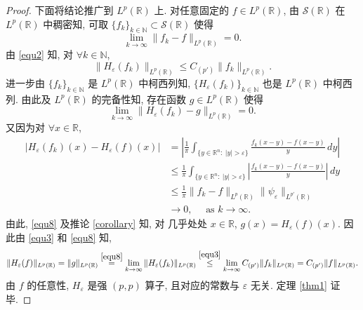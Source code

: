 \documentclass[a4paper,11pt]{article}
\theoremstyle{definition}
\begin{document}
\begin{CJK*}{UTF8}{gbsn}
\begin{proof}
    下面将结论推广到 $ L^p(\mathbb{R}) $ 上.
    对任意固定的 $ f \in L^p(\mathbb{R}) $, 
    由 $ \mathcal{S}(\mathbb{R}) $ 在 $ L^p(\mathbb{R}) $ 中稠密知, 
    可取 $ \{f_k\}_{k \in \mathbb{N}} \subset \mathcal{S}(\mathbb{R}) $ 使得
    $$
        \lim_{k \to \infty} \| f_k - f \|_{L^p(\mathbb{R})} = 0.
    $$
    由 \eqref{equ2} 知, 对 $ \forall k \in \mathbb{N} $,
    \begin{equation} \label{equ3}
        \| H_\varepsilon (f_k) \|_{L^p(\mathbb{R})} \leq C_{(p')} \| f_k \|_{L^p(\mathbb{R})}.
    \end{equation}
    进一步由 $ \{f_k\}_{k \in \mathbb{N}} $ 是 $ L^p(\mathbb{R}) $ 中柯西列知, 
    $ \{H_\varepsilon (f_k)\}_{k \in \mathbb{N}} $ 也是 $ L^p(\mathbb{R}) $ 中柯西列.
    由此及 $ L^p(\mathbb{R}) $ 的完备性知, 存在函数 $ g \in L^p(\mathbb{R}) $ 使得
    \begin{equation} \label{equ8}
        \lim_{k \to \infty} \| H_\varepsilon (f_k) - g \|_{L^p(\mathbb{R})} = 0.
    \end{equation}
    又因为对 $ \forall x \in \mathbb{R} $,
    \begin{align*}
        \left|H_\varepsilon (f_k) (x) - H_\varepsilon (f) (x)\right|
            &= \left| \frac{1}{\pi} \int_{\{y \in \mathbb{R}^n :\ |y| > \varepsilon\}} \frac{f_k(x - y) - f(x - y)}{y} \, dy \right| \\
            &\leq \frac{1}{\pi} \int_{\{y \in \mathbb{R}^n :\ |y| > \varepsilon\}} \left| \frac{f_k(x - y) - f(x - y)}{y} \right| \, dy \\
            &\leq \frac{1}{\pi} \| f_k - f \|_{L^p(\mathbb{R})} 
                \| \psi_\varepsilon \|_{L^{p'}(\mathbb{R})} \\
            &\to  0,  \quad \text{ as } k \to \infty.
    \end{align*}
    由此, \eqref{equ8} 及推论 \ref{corollary} 知, 对 几乎处处 $ x \in \mathbb{R} $, $ g(x) = H_\varepsilon (f) (x) $.
    因此由 \eqref{equ3} 和 \eqref{equ8} 知, 
    $$
        \| H_\varepsilon (f) \|_{L^p(\mathbb{R})} 
            = \| g \|_{L^p(\mathbb{R})} 
            \overset{\eqref{equ8}}{=} \lim_{k \to \infty} \| H_\varepsilon (f_k) \|_{L^p(\mathbb{R})} 
            \overset{\eqref{equ3}}{\leq} \lim_{k \to \infty} C_{(p')} \| f_k \|_{L^p(\mathbb{R})} 
            = C_{(p')} \| f \|_{L^p(\mathbb{R})}.
    $$
    由 $ f $ 的任意性, $ H_\varepsilon $ 是强 $ (p, p) $ 算子, 
    且对应的常数与 $ \varepsilon $ 无关. 定理 \ref{thm1} 证毕.
\end{proof}


\end{CJK*}
\end{document}
